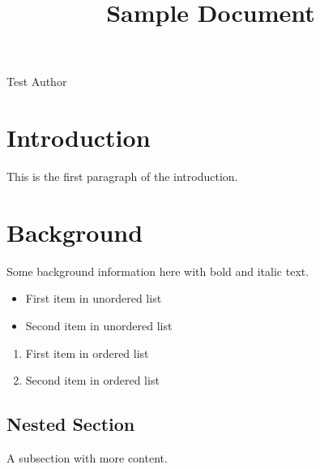 \documentclass[11pt,a4paper]{article}
\title{Sample Document}
\begin{document}
\maketitle

Test Author

\section{Introduction}

This is the first paragraph of the introduction.

\section{Background}

Some background information here with bold and italic text.

\begin{itemize}
\item First item in unordered list
\item Second item in unordered list
\end{itemize}

\begin{enumerate}
\item First item in ordered list
\item Second item in ordered list
\end{enumerate}

\subsection{Nested Section}

A subsection with more content.
\end{document}
